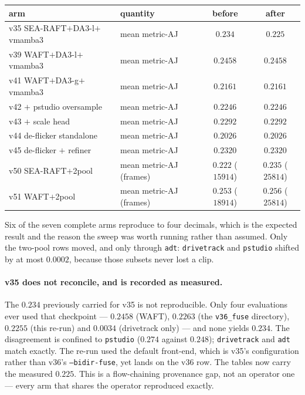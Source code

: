 \documentclass[11pt,a4paper]{article}
\begin{document}
\begin{center}
\begin{tabular}{llcc}
\toprule
arm & quantity & before & after \\
\midrule
v35 SEA-RAFT$+$DA3-l$+$vmamba3 & mean metric-AJ & $0.234$ & $0.225$ \\
v39 WAFT$+$DA3-l$+$vmamba3     & mean metric-AJ & $0.2458$ & $0.2458$ \\
v41 WAFT$+$DA3-g$+$vmamba3     & mean metric-AJ & $0.2161$ & $0.2161$ \\
v42 $+$ pstudio oversample     & mean metric-AJ & $0.2246$ & $0.2246$ \\
v43 $+$ scale head             & mean metric-AJ & $0.2292$ & $0.2292$ \\
v44 de-flicker standalone      & mean metric-AJ & $0.2026$ & $0.2026$ \\
v45 de-flicker $+$ refiner     & mean metric-AJ & $0.2320$ & $0.2320$ \\
\midrule
v50 SEA-RAFT$+$2pool & mean metric-AJ (frames) & $0.222$ ($15914$) & $\mathbf{0.235}$ ($25814$) \\
v51 WAFT$+$2pool     & mean metric-AJ (frames) & $0.253$ ($18914$) & $\mathbf{0.256}$ ($25814$) \\
\bottomrule
\end{tabular}
\end{center}

\noindent Six of the seven complete arms reproduce to four decimals, which is the expected result
and the reason the sweep was worth running rather than assumed. Only the two-pool rows moved, and
only through \texttt{adt}: \texttt{drivetrack} and \texttt{pstudio} shifted by at most $0.0002$,
because those subsets never lost a clip.

\paragraph{v35 does not reconcile, and is recorded as measured.} The $0.234$ previously carried for
v35 is not reproducible. Only four evaluations ever used that checkpoint --- $0.2458$ (WAFT),
$0.2263$ (the \texttt{v36\_fuse} directory), $0.2255$ (this re-run) and $0.0034$ (drivetrack only)
--- and none yields $0.234$. The disagreement is confined to \texttt{pstudio} ($0.274$ against
$0.248$); \texttt{drivetrack} and \texttt{adt} match exactly. The re-run used the default
front-end, which is v35's configuration rather than v36's \texttt{--bidir-fuse}, yet lands on the
v36 row. The tables now carry the measured $0.225$. This is a flow-chaining provenance gap, not an
operator one --- every arm that shares the operator reproduced exactly.
\end{document}
